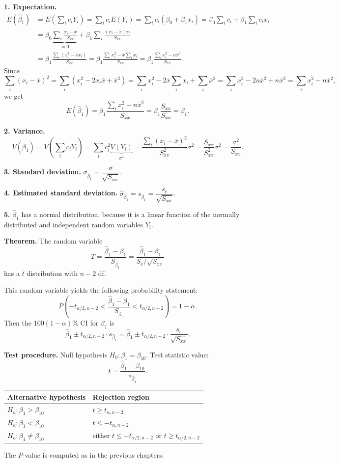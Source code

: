 \textbf{1. Expectation.}
\begin{align*}
E(\hat\beta_1) &= E\!\left(\sum_i c_iY_i\right)=\sum_i c_iE(Y_i)=\sum_i c_i(\beta_0+\beta_1x_i)=\beta_0\sum_i c_i+\beta_1\sum_i c_ix_i\\
&= \beta_0\underbrace{\sum_i\frac{x_i-\bar{x}}{S_{xx}}}_{=0}+\beta_1\sum_i\frac{(x_i-\bar{x})x_i}{S_{xx}}
\\
&=\beta_1\frac{\sum_i(x_i^2-\bar{x}x_i)}{S_{xx}}=\beta_1\frac{\sum_i x_i^2-\bar{x}\sum_i x_i}{S_{xx}}=\beta_1\frac{\sum_i x_i^2-n\bar{x}^2}{S_{xx}}.
\end{align*}
Since
\[
\sum_i(x_i-\bar{x})^2=\sum_i(x_i^2-2x_i\bar{x}+\bar{x}^2)=\sum_i x_i^2-2\bar{x}\sum_i x_i+\sum_i\bar{x}^2
=\sum_i x_i^2-2n\bar{x}^2+n\bar{x}^2=\sum_i x_i^2-n\bar{x}^2,
\]
we get
\[
E(\hat\beta_1)=\beta_1\frac{\sum_i x_i^2-n\bar{x}^2}{S_{xx}}=\beta_1\frac{S_{xx}}{S_{xx}}=\beta_1 .
\]

\textbf{2. Variance.}
\[
V(\hat\beta_1)=V\!\left(\sum_i c_iY_i\right)=\sum_i c_i^2\underbrace{V(Y_i)}_{\sigma^2}
=\frac{\sum_i(x_i-\bar{x})^2}{S_{xx}^2}\sigma^2=\frac{S_{xx}}{S_{xx}^2}\sigma^2=\frac{\sigma^2}{S_{xx}}.
\]

\textbf{3. Standard deviation.} $\sigma_{\hat\beta_1}=\dfrac{\sigma}{\sqrt{S_{xx}}}$.

\textbf{4. Estimated standard deviation.} $\hat\sigma_{\hat\beta_1}=s_{\hat\beta_1}=\dfrac{s_e}{\sqrt{S_{xx}}}$.

\textbf{5.} $\hat\beta_1$ has a normal distribution, because it is a linear function of the normally distributed and independent random variables $Y_i$.

\textbf{Theorem.} The random variable
\[
T=\frac{\hat\beta_1-\beta_1}{S_{\hat\beta_1}}=\frac{\hat\beta_1-\beta_1}{S_e/\sqrt{S_{xx}}}
\]
has a $t$ distribution with $n-2$ df.

This random variable yields the following probability statement:
\[
P\!\left(-t_{\alpha/2,n-2}<\frac{\hat\beta_1-\beta_1}{S_{\hat\beta_1}}<t_{\alpha/2,n-2}\right)=1-\alpha .
\]
Then the $100(1-\alpha)\%$ CI for $\beta_1$ is
\[
\hat\beta_1\pm t_{\alpha/2,n-2}\cdot s_{\hat\beta_1}=\hat\beta_1\pm t_{\alpha/2,n-2}\cdot\frac{s_e}{\sqrt{S_{xx}}}.
\]

\textbf{Test procedure.} Null hypothesis $H_0:\beta_1=\beta_{10}$. Test statistic value:
\[
t=\frac{\hat\beta_1-\beta_{10}}{s_{\hat\beta_1}}.
\]

\begin{center}
\begin{tabular}{ll}
\toprule
Alternative hypothesis & Rejection region\\
\midrule
$H_a:\beta_1>\beta_{10}$   & $t\ge t_{\alpha,n-2}$\\
$H_a:\beta_1<\beta_{10}$   & $t\le -t_{\alpha,n-2}$\\
$H_a:\beta_1\ne\beta_{10}$ & either $t\le -t_{\alpha/2,n-2}$ or $t\ge t_{\alpha/2,n-2}$\\
\bottomrule
\end{tabular}
\end{center}
The $P$-value is computed as in the previous chapters.

